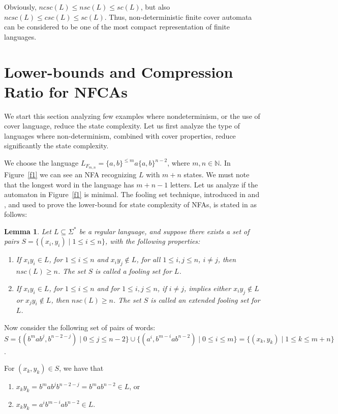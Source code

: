 \documentclass[submission,copyright,creativecommons]{eptcs}
\newcommand{\N}{{\mathbb N}}
\newtheorem{lemma}{Lemma}
\begin{document}
 

Obviously,  $ncsc(L)\leq nsc(L)\leq sc(L)$, but also 
$ncsc(L)\leq csc(L)\leq sc(L)$.
Thus, non-deterministic finite cover automata can be considered to be one of 
the most compact representation of finite languages.

\section{Lower-bounds and Compression Ratio for NFCAs}
\label{slowerbounds}

We start this section analyzing few examples where nondeterminism, 
or the use of cover language, reduce the state complexity.
Let us first analyze the type of languages where non-determinism, combined with cover properties,
 reduce significantly the state complexity.

We choose the language 
 $L_{F_{m,n}}=\{a,b\}^{\leq m}a\{a,b\}^{n-2}$, where $m,n\in \N$.
In Figure~\ref{f1} we can see an NFA recognizing $L$ with $m+n$ states.
We must note that the longest word in the language 
has $m+n-1$ letters.
Let us analyze if the automaton in Figure~\ref{f1}  is minimal.
The fooling set technique, introduced in \cite{Chrobak} and \cite{gramlich}, and used to prove the lower-bound 
for state complexity of NFAs,  is  stated in \cite{birget,Chrobak} as follows:

\begin{lemma}
\label{lfst1}
Let $L\subseteq \Sigma^*$ be a regular language, and suppose there  exists a set of pairs 
$S=\{(x_i,y_i)\mid 1\leq i\leq n\}$, with the following properties:
\begin{enumerate}
 \item 
  \label{sfst}
  If $x_i y_i\in L$, for $1\leq i\leq n$ and $x_iy_j\notin L$, for all 
$1\leq i,j\leq n$, $i\neq j$, then $nsc(L)\geq n$. The set $S$ is called {\em a fooling set} for $L$.
 \item 
 \label{extfst}
If $x_i y_i\in L$, for $1\leq i\leq n$ and for $1\leq i,j\leq n$, if $i\neq j$, implies  
either $x_iy_j\notin L$ 
or $x_jy_i\notin L$, 
 then $nsc(L)\geq n$. The set $S$ is called {\em an extended fooling set} for $L$.
\end{enumerate}
\end{lemma}

Now consider the following set of pairs of words:
$S=\{(b^mab^j,b^{n-2-j})\mid 0\leq j\leq n-2\}\cup\{(a^i,b^{m-i}ab^{n-2})\mid 0\leq i\leq m\}=
\{(x_k,y_k)\mid 1\leq k\leq m+n\}$.

For $(x_k,y_k)\in S$, we have  that
\begin{enumerate}
 \item $x_ky_k=b^mab^jb^{n-2-j}=b^mab^{n-2}\in L$, or
 \item $x_ky_k=a^ib^{m-i}ab^{n-2}\in L$.
\end{enumerate}
\end{document}
